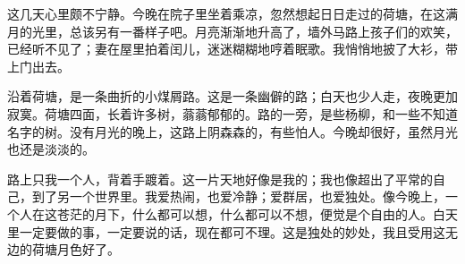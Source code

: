 \documentclass[twoside, UTF8, a4paper]{ctexart}
\numberwithin{figure}{section}
\numberwithin{table}{section}
\numberwithin{equation}{section}
\begin{document}
这几天心里颇不宁静。今晚在院子里坐着乘凉，忽然想起日日走过的荷塘，在这满月的光里，总该另有一番样子吧。月亮渐渐地升高了，墙外马路上孩子们的欢笑，已经听不见了；妻在屋里拍着闰儿，迷迷糊糊地哼着眠歌。我悄悄地披了大衫，带上门出去。

沿着荷塘，是一条曲折的小煤屑路。这是一条幽僻的路；白天也少人走，夜晚更加寂寞。荷塘四面，长着许多树，蓊蓊郁郁的。路的一旁，是些杨柳，和一些不知道名字的树。没有月光的晚上，这路上阴森森的，有些怕人。今晚却很好，虽然月光也还是淡淡的。

路上只我一个人，背着手踱着。这一片天地好像是我的；我也像超出了平常的自己，到了另一个世界里。我爱热闹，也爱冷静；爱群居，也爱独处。像今晚上，一个人在这苍茫的月下，什么都可以想，什么都可以不想，便觉是个自由的人。白天里一定要做的事，一定要说的话，现在都可不理。这是独处的妙处，我且受用这无边的荷塘月色好了。


\end{document}
